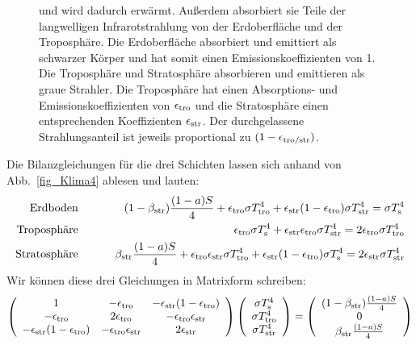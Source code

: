 \begin{figure}[htb]
{und wird dadurch erw\"armt. Au\ss erdem 
absorbiert sie Teile der langwelligen Infrarotstrahlung von der Erdoberfl\"ache und der Troposph\"are.
Die Erdoberfl\"ache absorbiert und emittiert als schwarzer K\"orper und hat somit einen
Emissionskoeffizienten von 1. Die Troposph\"are und Stratosph\"are absorbieren und emittieren als
\glqq graue Strahler\grqq. Die Troposph\"are hat einen Absorptions- und Emissionskoeffizienten
von $\epsilon_{\rm tro}$ und die Stratosph\"are einen entsprechenden Koeffizienten $\epsilon_{\rm str}$.
Der durchgelassene Strahlungsanteil ist jeweils proportional zu $(1-\epsilon_{\rm tro/str})$.
}
\end{figure}

Die Bilanzgleichungen f\"ur die drei Schichten lassen sich anhand von Abb.\ \ref{fig_Klima4} ablesen
und lauten:
\begin{eqnarray}
   \mbox{Erdboden} \hspace{1cm} & &  \hspace{-0.8cm}
      (1-\beta_{\rm str}) \frac{(1-a)S}{4} + \epsilon_{\rm tro} \sigma T_{\rm tro}^4 +
        \epsilon_{\rm str} (1-\epsilon_{\rm tro}) \sigma T_{\rm str}^4 =  \sigma T_{\rm s}^4  \\
 \label{eq_Trop}       
   \mbox{Troposph\"are} \hspace{1cm} & &  \hspace{3.5cm}
       \epsilon_{\rm tro} \sigma T_{\rm s}^4 +
        \epsilon_{\rm str} \epsilon_{\rm tro} \sigma T_{\rm str}^4 = 2 \epsilon_{\rm tro} \sigma T_{\rm tro}^4  \\
   \mbox{Stratosph\"are} \hspace{1cm} & & \hspace{-0.3cm}
        \beta_{\rm str} \frac{(1-a)S}{4} + \epsilon_{\rm tro} \epsilon_{\rm str} \sigma T_{\rm tro}^4 +
        \epsilon_{\rm str} (1-\epsilon_{\rm tro}) \sigma T_{\rm s}^4 =  2 \epsilon_{\rm str} \sigma T_{\rm str}^4 
\end{eqnarray}
Wir k\"onnen diese drei Gleichungen in Matrixform schreiben:
\begin{equation}
    \left( \begin{array}{ccc}  1 &  -\epsilon_{\rm tro} & - \epsilon_{\rm str} (1-\epsilon_{\rm tro}) \\
      - \epsilon_{\rm tro} &  2\epsilon_{\rm tro} &  - \epsilon_{\rm tro} \epsilon_{\rm str} \\ 
     - \epsilon_{\rm str} (1 - \epsilon_{\rm tro}) & - \epsilon_{\rm tro} \epsilon_{\rm str} & 2 \epsilon_{\rm str}
     \end{array} \right) \left( \begin{array}{c}  \sigma T_{\rm s}^4 \\ \sigma T_{\rm tro}^4 \\
       \sigma T_{\rm str}^4 \end{array} \right) 
      =  \left( \begin{array}{c} (1-\beta_{\rm str}) \frac{(1-a)S}{4} \\ 0 \\
             \beta_{\rm str} \frac{(1-a)S}{4}  \end{array} \right) 
\end{equation}
